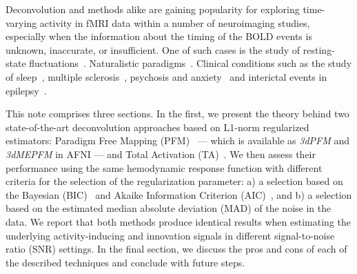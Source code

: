 Deconvolution and methods alike are gaining popularity for exploring time-varying activity in fMRI data within a number of neuroimaging studies, especially when the information about the timing of the BOLD events is unknown, inaccurate, or insufficient. One of such cases is the study of resting-state fluctuations~\cite{petridou2013PeriodsRestFMRI,karahanoglu2015TransientBrainActivity,karahanoglu2017DynamicsLargescaleFMRI,kinany2020DynamicFunctionalConnectivity,gonzalez-castillo2019ImagingSpontaneousFlow,allan2015FunctionalConnectivityMRI, zamaniesfahlani2020HighamplitudeCofluctuationsCortical}. Naturalistic paradigms~\cite{betzel2020TemporalFluctuationsBrain,faskowitz2020EdgecentricFunctionalNetwork}. Clinical conditions such as the study of sleep~\cite{tarun2021NREMSleepStagesa}, multiple sclerosis~\cite{bommarito2020FunctionalNetworkDynamicsa}, psychosis and anxiety~\cite{zoller2019LargeScaleBrainNetwork} and interictal events in epilepsy~\cite{lopes2012DetectionEpilepticActivity}.

This note comprises three sections. In the first, we present the theory behind two state-of-the-art deconvolution approaches based on L1-norm regularized estimators: Paradigm Free Mapping (PFM)~\cite{caballerogaudes2013ParadigmFreeMapping} --- which is available as \textit{3dPFM} and \textit{3dMEPFM} in AFNI --- and Total Activation (TA)~\cite{karahanoglu2013TotalActivationFMRI}. We then assess their performance using the same hemodynamic response function with different criteria for the selection of the regularization parameter: a) a selection based on the Bayesian (BIC)~\cite{schwarz1978EstimatingDimensionModel} and Akaike Information Criterion (AIC)~\cite{akaike1998InformationTheoryExtension}, and b) a selection based on the estimated median absolute deviation (MAD) of the noise in the data. We report that both methods produce identical results when estimating the underlying activity-inducing and innovation signals in different signal-to-noise ratio (SNR) settings. In the final section, we discuss the pros and cons of each of the described techniques and conclude with future steps.
